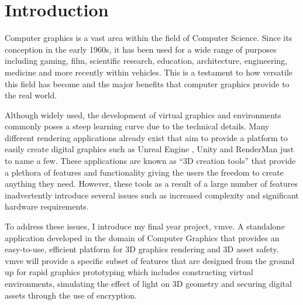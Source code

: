 \documentclass[11pt]{article}
\begin{document}
\section{Introduction}
Computer graphics is a vast area within the field of Computer Science. Since its
conception in the early 1960s, it has been used for a wide range of purposes
including gaming, film, scientific research, education, architecture,
engineering, medicine and more recently within vehicles. This is a testament to
how versatile this field has become and the major benefits that computer
graphics provide to the real world.

Although widely used, the development of virtual graphics and environments
commonly poses a steep learning curve due to the technical details. Many
different rendering applications already exist that aim to provide a platform to
easily create digital graphics such as  Unreal Engine \cite{unreal_engine},
Unity \cite{unity} and RenderMan \cite{render_man} just to name a few. These
applications are known as ``3D creation tools'' that provide a plethora of
features and functionality giving the users the freedom to create anything they
need. However, these tools as a result of a large number of features
inadvertently introduce several issues such as increased complexity and
significant hardware requirements.

To address these issues, I introduce my final year project, \gls*{vmve}. A
standalone application developed in the domain of Computer Graphics that
provides an easy-to-use, efficient platform for 3D graphics rendering and 3D
asset safety. \gls*{vmve} will provide a specific subset of features that
are designed from the ground up for rapid graphics prototyping which includes
constructing virtual environments, simulating the effect of light on 3D geometry
and securing digital assets through the use of encryption.
\end{document}

